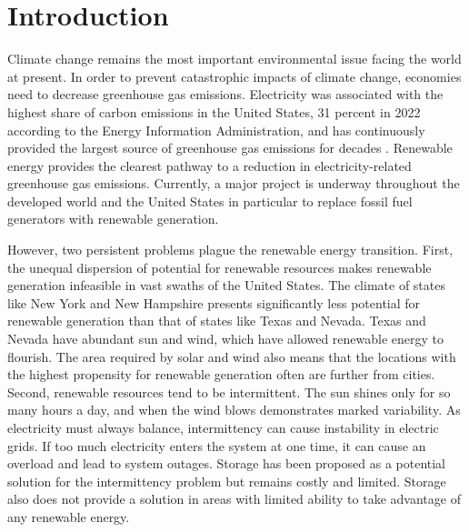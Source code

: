 \documentclass[12pt]{article}
\begin{document}
\doublespacing


\section{Introduction} \label{sec:introduction}

Climate change remains the most important environmental issue facing the world at present. In order to prevent catastrophic impacts of climate change, economies need to decrease greenhouse gas emissions. Electricity was associated with the highest share of carbon emissions in the United States, 31 percent in 2022 according to the Energy Information Administration, and has continuously provided the largest source of greenhouse gas emissions for decades \autocite{EIAReport}. Renewable energy provides the clearest pathway to a reduction in electricity-related greenhouse gas emissions. Currently, a major project is underway throughout the developed world and the United States in particular to replace fossil fuel generators with renewable generation.

However, two persistent problems plague the renewable energy transition. First, the unequal dispersion of potential for renewable resources makes renewable generation infeasible in vast swaths of the United States. The climate of states like New York and New Hampshire presents significantly less potential for renewable generation than that of states like Texas and Nevada. Texas and Nevada have abundant sun and wind, which have allowed renewable energy to flourish. The area required by solar and wind also means that the locations with the highest propensity for renewable generation often are further from cities. Second, renewable resources tend to be intermittent. The sun shines only for so many hours a day, and when the wind blows demonstrates marked variability. As electricity must always balance, intermittency can cause instability in electric grids. If too much electricity enters the system at one time, it can cause an overload and lead to system outages. Storage has been proposed as a potential solution for the intermittency problem but remains costly and limited. Storage also does not provide a solution in areas with limited ability to take advantage of any renewable energy.
\end{document}
